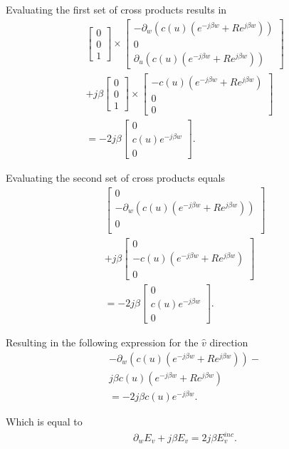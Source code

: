 Evaluating the first set of cross products results in 
\begin{multline}
    \begin{bmatrix}
        0 \\ 0 \\ 1
    \end{bmatrix} \times
    \begin{bmatrix}
        -\partial_w(c(u)(e^{-j\beta w}+Re^{j\beta w})) \\
        0 \\
        \partial_u(c(u)(e^{-j\beta w}+Re^{j\beta w}))
    \end{bmatrix} \\ +j\beta 
    \begin{bmatrix}
        0 \\ 0 \\ 1
    \end{bmatrix} \times
    \begin{bmatrix}
        -c(u)(e^{-j\beta w}+Re^{j\beta w}) \\
        0\\
        0
    \end{bmatrix} \\ =-2j\beta
    \begin{bmatrix}
        0 \\
        c(u)e^{-j\beta w}\\
        0
    \end{bmatrix}.
\end{multline}

Evaluating the second set of cross products equals
\begin{multline}
    \begin{bmatrix}
        0 \\
        -\partial_w(c(u)(e^{-j\beta w}+Re^{j\beta w})) \\
        0 \\ 
    \end{bmatrix} \\ +j\beta 
    \begin{bmatrix}
        0  \\
        -c(u)(e^{-j\beta w}+Re^{j\beta w})\\
        0
    \end{bmatrix} \\ =-2j\beta
    \begin{bmatrix}
        0 \\
        c(u)e^{-j\beta w}\\
        0
    \end{bmatrix}.
\end{multline}

Resulting in the following expression for the $\hat{v}$ direction
\begin{multline}
    -\partial_w(c(u)(e^{-j\beta w}+Re^{j\beta w}))-  \\ j\beta c(u)(e^{-j\beta w}+Re^{j\beta w}) \\ =-2j\beta c(u)e^{-j\beta w}.
\end{multline}

Which is equal to
\begin{align}
    \partial_w E_v+j\beta E_v =2j\beta E_v^{inc}.
\end{align}